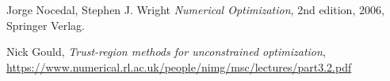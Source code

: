 \documentclass{book}
\newcommand\1{\uparrow}
\theoremstyle{plain}%
\theoremstyle{definition}
\theoremstyle{remark}
\newif\iftoc
\begin{document}
\iftoc
\tableofcontents
\newpage
\fi
 








\begin{thebibliography}{4}

 Jorge Nocedal, Stephen J. Wright
\textit{Numerical Optimization}, 2nd edition, 2006, Springer Verlag.

 Nick Gould,
\textit{Trust-region methods for unconstrained optimization},\\
\url{https://www.numerical.rl.ac.uk/people/nimg/msc/lectures/part3.2.pdf}

\end{thebibliography}
\end{document}
